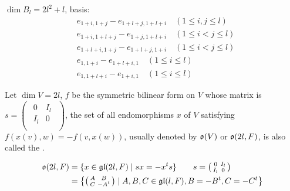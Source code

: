 \begin{exam}[$B_l$]
  $\dim B_l=2l^2+l$, basis:
  \begin{align*}
    & e_{1+i,1+j}-e_{1+l+j,1+l+i} \quad (1\leqslant i,j\leqslant l) \\
    & e_{1+i,1+l+j}-e_{1+j,1+l+i} \quad (1\leqslant i<j\leqslant l) \\
    & e_{1+l+i,1+j}-e_{1+l+j,1+i} \quad (1\leqslant i<j\leqslant l) \\
    & e_{1,1+i}-e_{1+l+i,1} \quad (1\leqslant i\leqslant l) \\
    & e_{1,1+l+i}-e_{1+i,1} \quad (1\leqslant i\leqslant l)
  \end{align*}
\end{exam}

\begin{exam}[$D_l$]
  Let $\dim V=2l$, $f$ be the symmetric bilinear form on $V$ whose matrix is $s=\begin{pmatrix}
                                                                                    \begin{smallmatrix}
                                                                                    0 & I_l \\
                                                                                    I_l & 0 \\
                                                                                    \end{smallmatrix}
                                                                                  \end{pmatrix}
  $, the set of all endomorphisms $x$ of $V$ satisfying $f(x(v),w)=-f(v,x(w))$, usually denoted by $\mathfrak{o}(V)$ or $\mathfrak{o}(2l,F)$, is also called the .

  \begin{align*}
    \mathfrak{o}(2l,F)&=\{x\in \mathfrak{g}\mathfrak{l}(2l,F)\mid sx=-x^ts \}\qquad s=\begin{pmatrix}
                                                                                    \begin{smallmatrix}
                                                                                    0 & I_l \\
                                                                                    I_l & 0 \\
                                                                                    \end{smallmatrix}
                                                                                  \end{pmatrix}
                                                             \\
    &=\left\{ \begin{pmatrix}
           \begin{smallmatrix}
           A & B \\
           C & -A^t \\
           \end{smallmatrix}
         \end{pmatrix}
         \mid A,B,C\in \mathfrak{g}\mathfrak{l}(l,F), B=-B^t,C=-C^t
     \right\}
  \end{align*}


\end{exam}

